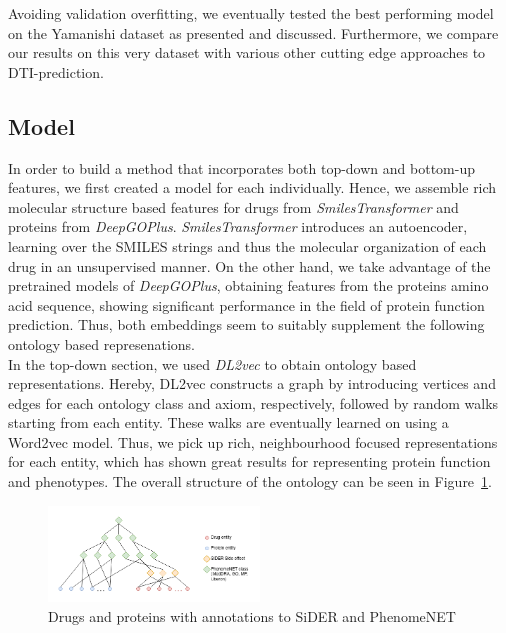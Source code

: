 \documentclass{bioinfo}
\begin{document}
Avoiding validation overfitting, we eventually tested the best performing model on the Yamanishi dataset as presented and discussed. Furthermore, we compare our results on this very dataset with various other cutting edge approaches to DTI-prediction.\\

\subsection{Model}
In order to build a method that incorporates both top-down and bottom-up features, we first created a model for each individually. Hence, we assemble rich molecular structure based features for drugs from \textit{SmilesTransformer}\citep{SmilesTransformer} and proteins from \textit{DeepGOPlus}\citep{DeepGoPlus}. \textit{SmilesTransformer} introduces an autoencoder, learning over the SMILES strings and thus the molecular organization of each drug in an unsupervised manner. On the other hand, we take advantage of the pretrained models of \textit{DeepGOPlus}, obtaining features from the proteins amino acid sequence, showing significant performance in the field of protein function prediction. Thus, both embeddings seem to suitably supplement the  following ontology based represenations.\\


In the top-down section, we used \textit{DL2vec}\citep{DL2vec2020} to obtain ontology based representations. Hereby, DL2vec constructs a graph by introducing vertices and edges for each ontology class and axiom, respectively, followed by random walks starting from each entity. These walks are eventually learned on using a Word2vec \citep{Word2vec2013} model. Thus, we pick up rich, neighbourhood focused representations for each entity, which has shown great results for representing protein function and phenotypes. The overall structure of the ontology can be seen in Figure~\ref{fig:Onto}.\\

\begin{figure}[!tpb]%
	\centerline{\includegraphics[width=0.5\textwidth]{figures/drug_protein_ontology_network.png}}
	\caption{Drugs and proteins with annotations to SiDER and PhenomeNET}\label{fig:Onto}
\end{figure}
\end{document}
